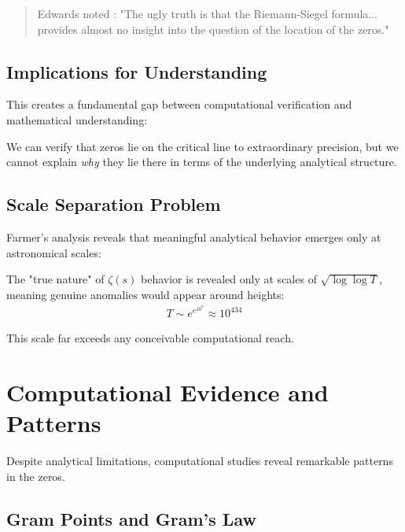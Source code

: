 \begin{quote}
Edwards noted \cite{edwards1974}: "The ugly truth is that the Riemann-Siegel formula... provides almost no insight into the question of the location of the zeros."
\end{quote}

\subsection{Implications for Understanding}

This creates a fundamental gap between computational verification and mathematical understanding:

\begin{remark}
We can verify that zeros lie on the critical line to extraordinary precision, but we cannot explain \textit{why} they lie there in terms of the underlying analytical structure.
\end{remark}

\subsection{Scale Separation Problem}

Farmer's analysis \cite{farmer2022} reveals that meaningful analytical behavior emerges only at astronomical scales:

\begin{theorem}
The "true nature" of $\zeta(s)$ behavior is revealed only at scales of $\sqrt{\log\log T}$, meaning genuine anomalies would appear around heights:
\begin{align}
T \sim e^{e^{10^6}} \approx 10^{434}
\end{align}
\end{theorem}

This scale far exceeds any conceivable computational reach.

\section{Computational Evidence and Patterns}
\label{sec:evidence-patterns}

Despite analytical limitations, computational studies reveal remarkable patterns in the zeros.

\subsection{Gram Points and Gram's Law}

